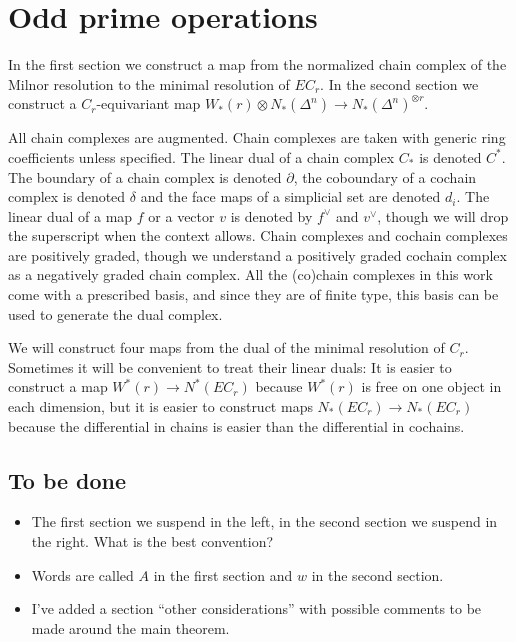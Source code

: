 
\section{Odd prime operations}

In the first section we construct a map from the normalized chain complex of the Milnor resolution to the minimal resolution of $EC_r$.
In the second section we construct a $C_r$-equivariant map $W_*(r)\otimes N_*(\Delta^n)\to N_*(\Delta^n)^{\otimes r}$.

All chain complexes are augmented. Chain complexes are taken with generic ring coefficients unless specified. The linear dual of a chain complex $C_*$ is denoted $C^*$. The boundary of a chain complex is denoted $\partial$, the coboundary of a cochain complex is denoted $\delta$ and the face maps of a simplicial set are denoted $d_i$. The linear dual of a map $f$ or a vector $v$ is denoted by $f^\vee$ and $v^\vee$, though we will drop the superscript when the context allows. Chain complexes and cochain complexes are positively graded, though we understand a positively graded cochain complex as a negatively graded chain complex. All the (co)chain complexes in this work come with a prescribed basis, and since they are of finite type, this basis can be used to generate the dual complex.

We will construct four maps from the dual of the minimal resolution of $C_r$. Sometimes it will be convenient to treat their linear duals: It is easier to construct a map $W^*(r)\to N^*(EC_r)$ because $W^*(r)$ is free on one object in each dimension, but it is easier to construct maps $N_*(EC_r)\to N_*(EC_r)$ because the differential in chains is easier than the differential in cochains.

\subsection*{To be done}
\begin{itemize}
	\item The first section we suspend in the left, in the second section we suspend in the right. What is the best convention?
	\item Words are called $A$ in the first section and $w$ in the second section.
	\item I've added a section ``other considerations'' with possible comments to be made around the main theorem.
\end{itemize}


